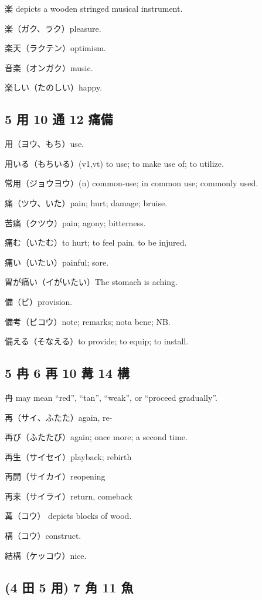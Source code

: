 楽 depicts a wooden stringed musical instrument.

楽（ガク、ラク）pleasure.

楽天（ラクテン）optimism.

音楽（オンガク）music.

楽しい（たのしい）happy.

\subsection{5 用 10 通 12 痛備}

用（ヨウ、もち）use.

用いる（もちいる）(v1,vt) to use; to make use of; to utilize.

常用（ジョウヨウ）(n) common-use; in common use; commonly used.

痛（ツウ、いた）pain; hurt; damage; bruise.

苦痛（クツウ）pain; agony; bitterness.

痛む（いたむ）to hurt; to feel pain. to be injured.

痛い（いたい）painful; sore.

胃が痛い（イがいたい）The stomach is aching.

備（ビ）provision.

備考（ビコウ）note; remarks; nota bene; NB.

備える（そなえる）to provide; to equip; to install.

\subsection{5 冉 6 再 10 冓 14 構}

冉 may mean ``red'', ``tan'', ``weak'', or ``proceed gradually''.

再（サイ、ふたた）again, re-

再び（ふたたび）again; once more; a second time.

再生（サイセイ）playback; rebirth

再開（サイカイ）reopening

再来（サイライ）return, comeback

冓（コウ） depicts blocks of wood.

構（コウ）construct.

結構（ケッコウ）nice.

\subsection{(4 田 5 用) 7 角 11 魚}

